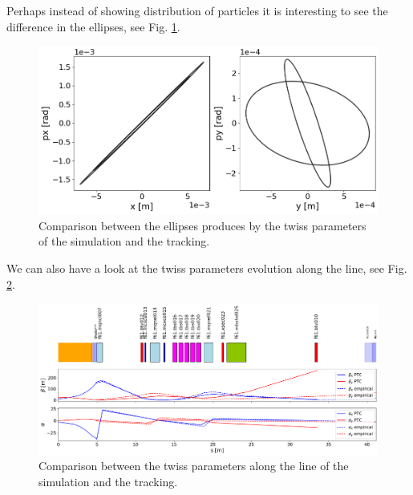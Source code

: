 Perhaps instead of showing distribution of particles it is interesting to see the difference in the ellipses, see Fig. \ref{fig:ellipses.}.

\begin{figure}[H]
\centering
\includegraphics[width=1.0\textwidth]{02_Simulation/images/ellipses.png}
\caption{Comparison between the ellipses produces by the twiss parameters of the simulation and the tracking.}
\label{fig:ellipses.}
\end{figure}

We can also have a look at the twiss parameters evolution along the line, see Fig. \ref{fig:twiss_params}.

\begin{figure}[H]
\centering
\includegraphics[width=1.0\textwidth]{02_Simulation/images/twiss_parameters_comparison.png}
\caption{Comparison between the twiss parameters along the line of the simulation and the tracking.}
\label{fig:twiss_params}
\end{figure}

